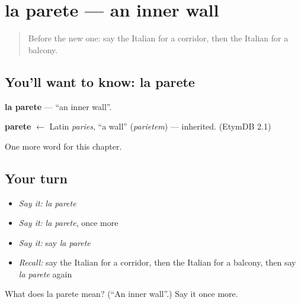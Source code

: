 \section[la parete]{la parete — an inner wall}

\label{lesson:IT-C159-parete}



\begin{quote}
Before the new one: say the Italian for a corridor, then the Italian for a balcony.
\end{quote}

\subsection*{You'll want to know: la parete}
\textbf{la parete} — \textquotedblleft{}an inner wall\textquotedblright{}.

\begin{cousinweb}
\textbf{parete} $\leftarrow$ Latin \emph{paries}, \textquotedblleft{}a wall\textquotedblright{} (\emph{parietem}) — inherited. (EtymDB 2.1)
\end{cousinweb}

\begin{grammarlens}[title={What you've built}]
One more word for this chapter.
\end{grammarlens}

\subsection*{Your turn}
\begin{itemize}
\raggedright
  \item \emph{Say it:} \emph{la parete}
  \item \emph{Say it:} \emph{la parete}, once more
  \item \emph{Say it:} say \emph{la parete}
  \item \emph{Recall:} say the Italian for a corridor, then the Italian for a balcony, then say \emph{la parete} again
\end{itemize}

\begin{tcolorbox}[breakable,colback=teal!4,colframe=teal!35!black,title={Before you move on}]
What does la parete mean? (\textquotedblleft{}An inner wall\textquotedblright{}.) Say it once more.
\end{tcolorbox}

